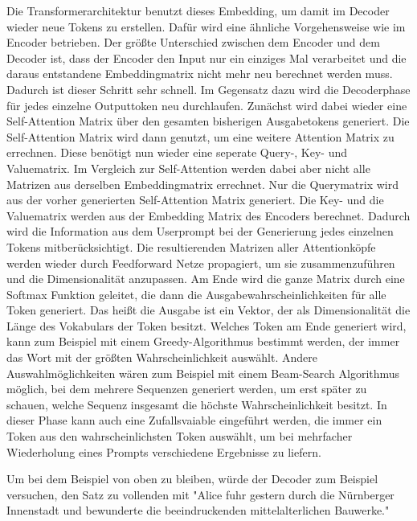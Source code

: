 Die Transformerarchitektur benutzt dieses Embedding, um damit im Decoder wieder neue Tokens zu erstellen.
Dafür wird eine ähnliche Vorgehensweise wie im Encoder betrieben.
Der größte Unterschied zwischen dem Encoder und dem Decoder ist, dass der Encoder den Input nur ein einziges Mal verarbeitet und die daraus entstandene Embeddingmatrix nicht mehr neu berechnet werden muss.
Dadurch ist dieser Schritt sehr schnell.
Im Gegensatz dazu wird die Decoderphase für jedes einzelne Outputtoken neu durchlaufen.
Zunächst wird dabei wieder eine Self-Attention Matrix über den gesamten bisherigen Ausgabetokens generiert.
Die Self-Attention Matrix wird dann genutzt, um eine weitere Attention Matrix zu errechnen.
Diese benötigt nun wieder eine seperate Query-, Key- und Valuematrix.
Im Vergleich zur Self-Attention werden dabei aber nicht alle Matrizen aus derselben Embeddingmatrix errechnet.
Nur die Querymatrix wird aus der vorher generierten Self-Attention Matrix generiert.
Die Key- und die Valuematrix werden aus der Embedding Matrix des Encoders berechnet. 
Dadurch wird die Information aus dem Userprompt bei der Generierung jedes einzelnen Tokens mitberücksichtigt. 
Die resultierenden Matrizen aller Attentionköpfe werden wieder durch Feedforward Netze propagiert, um sie zusammenzuführen und die Dimensionalität anzupassen.
Am Ende wird die ganze Matrix durch eine Softmax Funktion geleitet, die dann die Ausgabewahrscheinlichkeiten für alle Token generiert.
Das heißt die Ausgabe ist ein Vektor, der als Dimensionalität die Länge des Vokabulars der Token besitzt.
Welches Token am Ende generiert wird, kann zum Beispiel mit einem Greedy-Algorithmus bestimmt werden, der immer das Wort mit der größten Wahrscheinlichkeit auswählt.
Andere Auswahlmöglichkeiten wären zum Beispiel mit einem Beam-Search Algorithmus möglich, bei dem mehrere Sequenzen generiert werden, um erst später zu schauen, welche Sequenz insgesamt die höchste Wahrscheinlichkeit besitzt.
In dieser Phase kann auch eine Zufallsvaiable eingeführt werden, die immer ein Token aus den wahrscheinlichsten Token auswählt, um bei mehrfacher Wiederholung eines Prompts verschiedene Ergebnisse zu liefern.

Um bei dem Beispiel von oben zu bleiben, würde der Decoder zum Beispiel versuchen, den Satz zu vollenden mit  "Alice fuhr gestern durch die Nürnberger Innenstadt und bewunderte die beeindruckenden mittelalterlichen Bauwerke."
\cite{vaswani2023}



